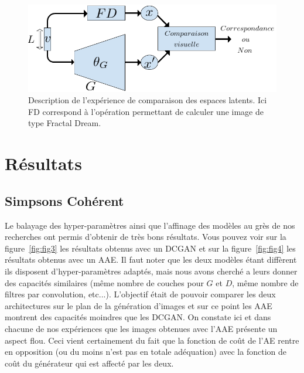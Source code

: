 \documentclass[11pt,francais]{article}
\begin{document}
\begin{figure}[!h]
    \centering
    \includegraphics[width=\textwidth]{Figures/CorrespondancesLS/CorrespondancesLS.png}
    \caption{Description de l'expérience de comparaison des espaces latents. Ici FD correspond à l'opération permettant de calculer une image de type Fractal Dream.}
    \label{fig:fig11}
\end{figure}


\section{Résultats}
\subsection{Simpsons Cohérent}
\label{sec:SimpsonsCoherent}

Le balayage des hyper-paramètres ainsi que l'affinage des modèles au grès de nos recherches ont permis d'obtenir de très bons résultats. Vous pouvez voir sur la figure~\ref{fig:fig3} les résultats obtenus avec un DCGAN et sur la figure~\ref{fig:fig4} les résultats obtenus avec un AAE. 
Il faut noter que les deux modèles étant diffèrent ils disposent d'hyper-paramètres adaptés, mais nous avons cherché a leurs donner des capacités similaires (même nombre de couches pour \(G\) et \(D\), même nombre de filtres par convolution, etc...). L'objectif était de pouvoir comparer les deux architectures sur le plan de la génération d'images et sur ce point les AAE montrent des capacités moindres que les DCGAN.
On constate ici et dans chacune de nos expériences que les images obtenues avec l'AAE présente un aspect flou. Ceci vient certainement du fait que la fonction de coût de l'AE rentre en opposition (ou du moins n'est pas en totale adéquation) avec la fonction de coût du générateur qui est affecté par les deux.
\end{document}
